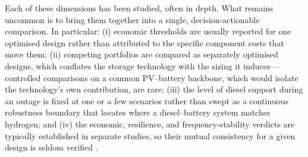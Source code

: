 \documentclass[preprint,12pt]{elsarticle}
\begin{document}
Each of these dimensions has been studied, often in depth. What remains uncommon
is to bring them together into a single, decision-actionable comparison. In
particular: (i) economic thresholds are usually reported for one optimised design
rather than attributed to the specific component costs that move them; (ii)
competing portfolios are compared as separately optimised designs, which conflates
the storage technology with the sizing it induces---controlled comparisons on a
common PV--battery backbone, which would isolate the technology's own
contribution, are rare; (iii) the level of diesel support during an outage is
fixed at one or a few scenarios rather than swept as a continuous robustness
boundary that locates where a diesel--battery system matches hydrogen; and (iv)
the economic, resilience, and frequency-stability verdicts are typically
established in separate studies, so their mutual consistency for a given design is
seldom verified
\cite{huang_2023_economic_resilient_h2_microgrid,shahbazbegian_2023_resilience_p2h,sharifpour_2023_hydrogen_extreme_events,sepulveda_2021_ldes_design_space,rosales_asensio_2022_critical_customers,mishra2023microgrid,bertheau2018resilient}.
\end{document}
